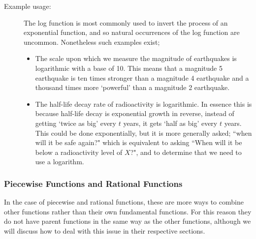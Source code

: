 \documentclass{ximera}
\begin{document}
\begin{description}
            \item[Example usage:] The log function is most commonly used to invert the process of an exponential function, and so natural occurrences of the log function are uncommon. Nonetheless such examples exist;
            \begin{itemize}
                \item The scale upon which we measure the magnitude of earthquakes is logarithmic with a base of 10. This means that a magnitude 5 earthquake is ten times stronger than a magnitude 4 earthquake and a thousand times more `powerful' than a magnitude 2 earthquake.
                \item The half-life decay rate of radioactivity is logarithmic. In essence this is because half-life decay is exponential growth in reverse, instead of getting `twice as big' every $t$ years, it gets `half as big' every $t$ years. This could be done exponentially, but it is more generally asked; ``when will it be safe again?" which is equivalent to asking ``When will it be below a radioactivity level of $X$?", and to determine that we need to use a logarithm.
            \end{itemize}
        \end{description}

    \subsubsection*{Piecewise Functions and Rational Functions}
        In the case of piecewise and rational functions, these are more ways to combine other functions rather than their own fundamental functions. For this reason they do not have parent functions in the same way as the other functions, although we will discuss how to deal with this issue in their respective sections.
\end{document}
